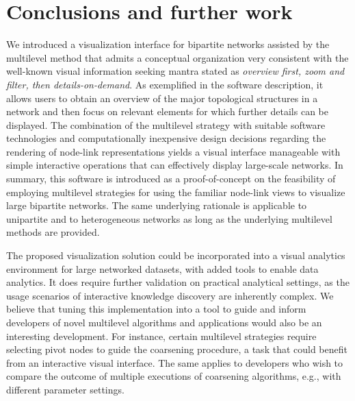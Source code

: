 \documentclass[runningheads]{llncs}
\begin{document}

\section{Conclusions and further work}\label{con}
We introduced a visualization interface for bipartite networks
assisted by the multilevel method that admits a conceptual organization very consistent with the well-known visual information seeking mantra stated as \emph{overview first, zoom and filter, then details-on-demand}. As exemplified in the software description, it allows users to obtain an overview of the major topological structures in a network and then focus on relevant elements for which further details can be displayed.
The combination of the multilevel strategy with suitable software technologies and computationally inexpensive design decisions regarding
the rendering of node-link representations yields a visual interface manageable with simple interactive operations that can effectively display large-scale networks. In summary, this software is introduced as a proof-of-concept on the feasibility of employing multilevel strategies for using the familiar node-link views  to visualize large bipartite networks. The same underlying rationale is applicable to unipartite and to heterogeneous networks as long as the underlying multilevel methods are provided.

The proposed visualization solution could be incorporated into a visual analytics environment for large networked datasets, with added tools to enable data analytics. It does require further validation on practical analytical settings, as the  usage scenarios of interactive knowledge discovery are inherently complex.
We believe that tuning this implementation into a tool to guide and inform developers of novel multilevel algorithms and applications would also be an interesting development. For instance, certain multilevel strategies require selecting pivot nodes to guide the coarsening procedure, a task that could benefit from an interactive visual interface. The same applies to developers who wish to compare the outcome of  multiple executions of coarsening algorithms, e.g., with different parameter settings.   
\end{document}
